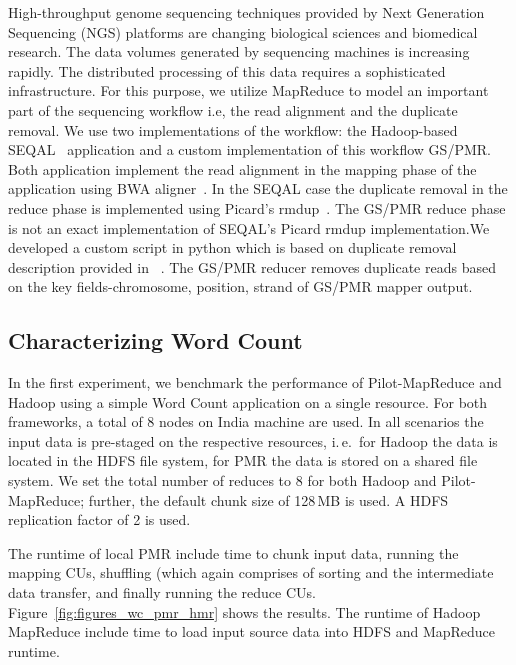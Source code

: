 \documentclass{acm_proc_article-sp}
\newcommand{\pilotmapreduce}{Pilot-MapReduce\xspace}
\begin{document}
High-throughput genome sequencing techniques provided by Next Generation
Sequencing (NGS) platforms are changing biological sciences and biomedical
research. The data volumes generated by sequencing machines is increasing
rapidly. The distributed processing of this data requires a sophisticated
infrastructure. For this purpose, we utilize MapReduce to model an important
part of the sequencing workflow i.e, the read alignment and the duplicate
removal. We use two implementations of the workflow: the Hadoop-based 
SEQAL~\cite{seal-2011} application and a custom implementation of this workflow 
GS/PMR. Both application implement the read alignment in the mapping phase of 
the application using BWA aligner~\cite{Li:2010:FAL:1741823.1741825}. In the 
SEQAL case the duplicate removal in the reduce phase is implemented using  
Picard's rmdup~\cite{picard}. The GS/PMR reduce phase is not an exact implementation of
SEQAL's Picard rmdup implementation.We developed a custom script in python
which is based on duplicate removal description provided in ~\cite{seal-2011}. 
The GS/PMR reducer removes duplicate reads based on the key fields-chromosome,
position, strand of GS/PMR mapper output.


\subsection{Characterizing Word Count}


In the first experiment, we benchmark the performance of \pilotmapreduce and
Hadoop using a simple Word Count application on a single resource. For both
frameworks, a total of 8 nodes on India machine are used. In all scenarios the
input data is pre-staged on the respective resources, i.\,e.\ for Hadoop the
data is located in the HDFS file system, for PMR the data is stored on a shared
file system. We set the total number of reduces to 8 for both Hadoop and
\pilotmapreduce; further, the default chunk size of 128\,MB is used. A HDFS
replication factor of 2 is used.

The runtime of local PMR include time to chunk input data, running the mapping
CUs, shuffling (which again comprises of sorting and the intermediate data
transfer, and finally running the reduce CUs.
Figure~\ref{fig:figures_wc_pmr_hmr} shows the results. The runtime
of Hadoop MapReduce include time to load input source data into HDFS and
MapReduce runtime.
\end{document}
